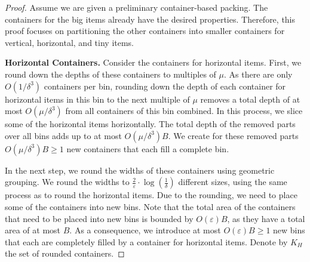 \documentclass[a4paper,UKenglish,cleveref, autoref, thm-restate]{lipics-v2021}
\newcommand{\eps}{\varepsilon}
\newcommand{\bigy}{big\xspace}
\newcommand{\tin}{tiny\xspace}
\begin{document}
\begin{proof}
Assume we are given a preliminary container-based packing. 
The containers for the \bigy items already have the desired properties.
Therefore, this proof focuses on partitioning the other containers into smaller containers for vertical, horizontal, and \tin items.


\textbf{Horizontal Containers.}
Consider the containers for horizontal items. First, we round down the depths of these containers to multiples of $\mu$. 
As there are only ${O}(1/\delta^3)$ containers per bin,
rounding down the depth of each container for horizontal items in this bin to the next multiple of $\mu$ removes a total depth of at most ${O}(\mu/\delta^3)$ from all containers of this bin combined.
In this process, we slice some of the horizontal items horizontally.
The total depth of the removed parts over all bins adds up to at most ${O}(\mu/\delta^3) B$.
We create for these removed parts ${O}(\mu/\delta^3) B\geq 1$ new containers that each fill a complete bin.

In the next step, we round the widths of these containers using geometric grouping.
We round the widths to $\frac{2}{\eps} \cdot \log(\frac{1}{\delta})$ different sizes, using the same process as to round the horizontal items.
Due to the rounding, we need to place some of the containers into new bins. 
Note that the total area of the containers that need to be placed into new bins is bounded by $O(\eps)B$, as they have a total area of at most $B$.
As a consequence, we introduce at most $O(\eps)B\geq 1$ new bins that each are completely filled by a container for horizontal items. 
Denote by $K_H$ the set of rounded containers.



\end{proof}
\end{document}
